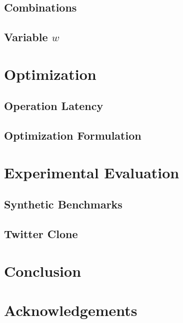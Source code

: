 \documentclass{vldb}
\begin{document}
\subsection{Combinations}

\subsection{Variable $w$}

\section{Optimization}

\subsection{Operation Latency}

\subsection{Optimization Formulation}

\section{Experimental Evaluation}

\subsection{Synthetic Benchmarks}

\subsection{Twitter Clone}

\section{Conclusion}

\section*{Acknowledgements}

\balance



\end{document}
